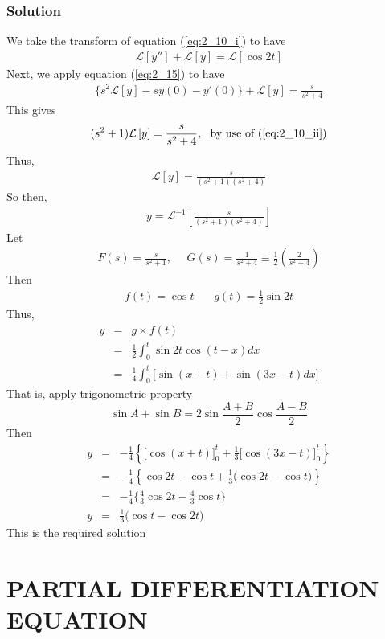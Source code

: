 \documentclass[11pt]{report}
\newcommand{\Laplace}{\mathcal{L}}
\newcommand{\ft}{f(t)}
\newcommand{\sbracket}[1]{\left[#1\right]}
\newcommand{\Ly}{\Laplace \sbracket{y}}
\newcommand{\Lyp}[1]{\Laplace \sbracket{y{#1}}}
\newcommand{\LFn}[1]{\Laplace \sbracket{#1}}
\newcommand{\InverseL}[1]{\Laplace^{-1}\left[#1\right]}
\newcommand{\sps}{\\[0.2cm]}
\newcommand{\refn}[1]{(\ref{#1})}
\newcommand{\refx}[1]{\refn{eq:#1}}
\newcommand{\sprime}{'}
\newcommand{\dprime}{''}
\begin{document}
	\subsection*{Solution}
	We take the transform of equation \refx{2_10_i} to have
	\begin{eqnarray*}
		\Lyp{\dprime} + \Ly = \LFn{\cos 2t}
	\end{eqnarray*}
	Next, we apply equation \refx{2_15} to have
	\begin{eqnarray*}
		\Big\{ s^2\Ly - sy(0) - y\sprime(0) \Big\}+ \Ly = \frac{s}{s^2 + 4}
	\end{eqnarray*}
	This gives
	\begin{eqnarray*}
		(s^2+1)\Ly = \frac{s}{s^2 + 4},~~ \text{by use of \refx{2_10_ii}}
	\end{eqnarray*}
	Thus,
	\begin{eqnarray*}
		\Ly = \frac{s}{(s^2+1)(s^2+4)}
	\end{eqnarray*}
	So then,
	\begin{eqnarray*}
		y = \InverseL{\frac{s}{(s^2+1)(s^2+4)}}
	\end{eqnarray*}
	Let
	\begin{eqnarray*}
		F(s)=\frac{s}{s^2+1}, ~~~~~~ G(s)= \frac{1}{s^2+4} \equiv \frac{1}{2}\left(\frac{2}{s^2+4}\right)
	\end{eqnarray*}
	Then
	\begin{eqnarray*}
		f(t)=\cos t ~~~~~~~~ g(t)=\frac{1}{2}\sin 2t
	\end{eqnarray*}
	Thus,
	\begin{eqnarray*}
		y &=& g \times \ft\sps
		&=&\frac{1}{2}\int_0^t\sin 2t\cos(t-x)dx\sps
		&=&\frac{1}{4}\int_0^t\Big[\sin(x+t)+\sin(3x-t)dx\Big]
	\end{eqnarray*}
	That is, apply trigonometric property
	\begin{equation*}
		\sin A + \sin B = 2\sin\frac{A+B}{2}\cos\frac{A-B}{2}
	\end{equation*}
	Then
	\begin{eqnarray*}
		y&=&-\frac{1}{4}\left\{ \Big[\cos(x+t)\Big]_0^t + \frac{1}{3}\Big[\cos(3x-t)\Big]_0^t \right\}\sps
		&=&-\frac{1}{4}\left\{\cos 2t - \cos t + \frac{1}{3}\Big(\cos 2t - \cos t\Big)\right\}\sps
		&=&-\frac{1}{4}\Big\{\frac{4}{3}\cos 2t - \frac{4}{3}\cos t\Big\}\sps
		y&=&\frac{1}{3}\Big(\cos t - \cos 2t\Big)
	\end{eqnarray*}
	This is the required solution
	
	\chapter{PARTIAL DIFFERENTIATION EQUATION}
\end{document}
